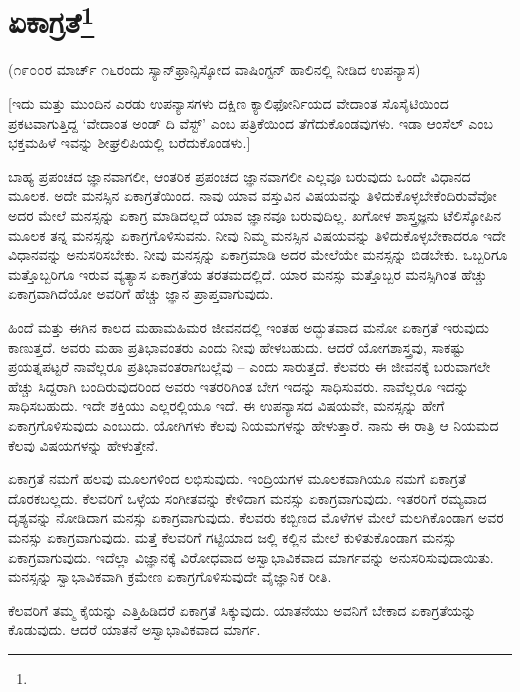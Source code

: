 
\chapter[ಏಕಾಗ್ರತೆ]{ಏಕಾಗ್ರತೆ\protect\footnote{}}

\begin{center}
(೧೯೦೦ರ ಮಾರ್ಚ್ ೧೬ರಂದು ಸ್ಯಾನ್‌ಫ್ರಾನ್ಸಿಸ್ಕೋದ ವಾಷಿಂಗ್ಟನ್ ಹಾಲಿನಲ್ಲಿ ನೀಡಿದ ಉಪನ್ಯಾಸ)
\end{center}

[ಇದು ಮತ್ತು ಮುಂದಿನ ಎರಡು ಉಪನ್ಯಾಸಗಳು ದಕ್ಷಿಣ ಕ್ಯಾಲಿಫೋರ್ನಿಯದ ವೇದಾಂತ ಸೊಸೈಟಿಯಿಂದ ಪ್ರಕಟವಾಗುತ್ತಿದ್ದ `ವೇದಾಂತ ಅಂಡ್ ದಿ ವೆಸ್ಟ್' ಎಂಬ ಪತ್ರಿಕೆಯಿಂದ ತೆಗೆದುಕೊಂಡವುಗಳು. ಇಡಾ ಆಂಸೆಲ್ ಎಂಬ ಭಕ್ತಮಹಿಳೆ ಇವನ್ನು ಶೀಘ್ರಲಿಪಿಯಲ್ಲಿ ಬರೆದುಕೊಂಡಳು.]

ಬಾಹ್ಯ ಪ್ರಪಂಚದ ಜ್ಞಾನವಾಗಲೀ, ಆಂತರಿಕ ಪ್ರಪಂಚದ ಜ್ಞಾನವಾಗಲೀ ಎಲ್ಲವೂ ಬರುವುದು ಒಂದೇ ವಿಧಾನದ ಮೂಲಕ. ಅದೇ ಮನಸ್ಸಿನ ಏಕಾಗ್ರತೆಯಿಂದ. ನಾವು ಯಾವ ವಸ್ತುವಿನ ವಿಷಯವನ್ನು ತಿಳಿದುಕೊಳ್ಳಬೇಕೆಂದಿರುವೆವೋ ಅದರ ಮೇಲೆ ಮನಸ್ಸನ್ನು ಏಕಾಗ್ರ ಮಾಡಿದಲ್ಲದೆ ಯಾವ ಜ್ಞಾನವೂ ಬರುವುದಿಲ್ಲ. ಖಗೋಳ ಶಾಸ್ತ್ರಜ್ಞನು ಟೆಲಿಸ್ಕೋಪಿನ ಮೂಲಕ ತನ್ನ ಮನಸ್ಸನ್ನು ಏಕಾಗ್ರಗೊಳಿಸುವನು. ನೀವು ನಿಮ್ಮ ಮನಸ್ಸಿನ ವಿಷಯವನ್ನು ತಿಳಿದುಕೊಳ್ಳಬೇಕಾದರೂ ಇದೇ ವಿಧಾನವನ್ನು ಅನುಸರಿಸಬೇಕು. ನೀವು ಮನಸ್ಸನ್ನು ಏಕಾಗ್ರಮಾಡಿ ಅದರ ಮೇಲೆಯೇ ಮನಸ್ಸನ್ನು ಬಿಡಬೇಕು. ಒಬ್ಬರಿಗೂ ಮತ್ತೊಬ್ಬರಿಗೂ ಇರುವ ವ್ಯತ್ಯಾಸ ಏಕಾಗ್ರತೆಯ ತರತಮದಲ್ಲಿದೆ. ಯಾರ ಮನಸ್ಸು ಮತ್ತೊಬ್ಬರ ಮನಸ್ಸಿಗಿಂತ ಹೆಚ್ಚು ಏಕಾಗ್ರವಾಗಿದೆಯೋ ಅವರಿಗೆ ಹೆಚ್ಚು ಜ್ಞಾನ ಪ್ರಾಪ್ತವಾಗುವುದು.

ಹಿಂದೆ ಮತ್ತು ಈಗಿನ ಕಾಲದ ಮಹಾಮಹಿಮರ ಜೀವನದಲ್ಲಿ ಇಂತಹ ಅದ್ಭುತವಾದ ಮನೋ ಏಕಾಗ್ರತೆ ಇರುವುದು ಕಾಣುತ್ತದೆ. ಅವರು ಮಹಾ ಪ್ರತಿಭಾವಂತರು ಎಂದು ನೀವು ಹೇಳಬಹುದು. ಆದರೆ ಯೋಗಶಾಸ್ತ್ರವು, ಸಾಕಷ್ಟು ಪ್ರಯತ್ನಪಟ್ಟರೆ ನಾವೆಲ್ಲರೂ ಪ್ರತಿಭಾವಂತರಾಗಬಲ್ಲೆವು – ಎಂದು ಸಾರುತ್ತದೆ. ಕೆಲವರು ಈ ಜೀವನಕ್ಕೆ ಬರುವಾಗಲೇ ಹೆಚ್ಚು ಸಿದ್ದರಾಗಿ ಬಂದಿರುವುದರಿಂದ ಅವರು ಇತರರಿಗಿಂತ ಬೇಗ ಇದನ್ನು ಸಾಧಿಸುವರು. ನಾವೆಲ್ಲರೂ ಇದನ್ನು ಸಾಧಿಸಬಹುದು. ಇದೇ ಶಕ್ತಿಯು ಎಲ್ಲರಲ್ಲಿಯೂ ಇದೆ. ಈ ಉಪನ್ಯಾಸದ ವಿಷಯವೇ, ಮನಸ್ಸನ್ನು ಹೇಗೆ ಏಕಾಗ್ರಗೊಳಿಸುವುದು ಎಂಬುದು. ಯೋಗಿಗಳು ಕೆಲವು ನಿಯಮಗಳನ್ನು ಹೇಳುತ್ತಾರೆ. ನಾನು ಈ ರಾತ್ರಿ ಆ ನಿಯಮದ ಕೆಲವು ವಿಷಯಗಳನ್ನು ಹೇಳುತ್ತೇನೆ.

ಏಕಾಗ್ರತೆ ನಮಗೆ ಹಲವು ಮೂಲಗಳಿಂದ ಲಭಿಸುವುದು. ಇಂದ್ರಿಯಗಳ ಮೂಲಕವಾಗಿಯೂ ನಮಗೆ ಏಕಾಗ್ರತೆ ದೊರಕಬಲ್ಲದು. ಕೆಲವರಿಗೆ ಒಳ್ಳೆಯ ಸಂಗೀತವನ್ನು ಕೇಳಿದಾಗ ಮನಸ್ಸು ಏಕಾಗ್ರವಾಗುವುದು. ಇತರರಿಗೆ ರಮ್ಯವಾದ ದೃಶ್ಯವನ್ನು ನೋಡಿದಾಗ ಮನಸ್ಸು ಏಕಾಗ್ರವಾಗುವುದು. ಕೆಲವರು ಕಬ್ಬಿಣದ ಮೊಳೆಗಳ ಮೇಲೆ ಮಲಗಿಕೊಂಡಾಗ ಅವರ ಮನಸ್ಸು ಏಕಾಗ್ರವಾಗುವುದು. ಮತ್ತೆ ಕೆಲವರಿಗೆ ಗಟ್ಟಿಯಾದ ಜಲ್ಲಿ ಕಲ್ಲಿನ ಮೇಲೆ ಕುಳಿತುಕೊಂಡಾಗ ಮನಸ್ಸು ಏಕಾಗ್ರವಾಗುವುದು. ಇದೆಲ್ಲಾ ವಿಜ್ಞಾನಕ್ಕೆ ವಿರೋಧವಾದ ಅಸ್ವಾಭಾವಿಕವಾದ ಮಾರ್ಗವನ್ನು ಅನುಸರಿಸುವುದಾಯಿತು. ಮನಸ್ಸನ್ನು ಸ್ವಾಭಾವಿಕವಾಗಿ ಕ್ರಮೇಣ ಏಕಾಗ್ರಗೊಳಿಸುವುದೇ ವೈಜ್ಞಾನಿಕ ರೀತಿ.

ಕೆಲವರಿಗೆ ತಮ್ಮ ಕೈಯನ್ನು ಎತ್ತಿಹಿಡಿದರೆ ಏಕಾಗ್ರತೆ ಸಿಕ್ಕುವುದು. ಯಾತನೆಯು ಅವನಿಗೆ ಬೇಕಾದ ಏಕಾಗ್ರತೆಯನ್ನು ಕೊಡುವುದು. ಆದರೆ ಯಾತನೆ ಅಸ್ವಾಭಾವಿಕವಾದ ಮಾರ್ಗ.

